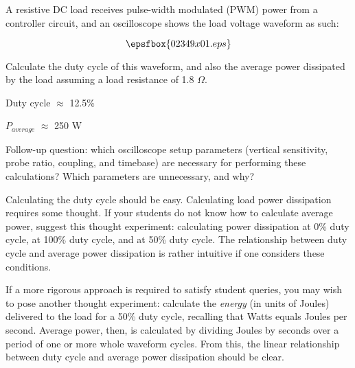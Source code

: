 

A resistive DC load receives pulse-width modulated (PWM) power from a controller circuit, and an oscilloscope shows the load voltage waveform as such:

$$\epsfbox{02349x01.eps}$$

Calculate the duty cycle of this waveform, and also the average power dissipated by the load assuming a load resistance of 1.8 $\Omega$.







Duty cycle $\approx$ 12.5\%

$P_{average}$ $\approx$ 250 W

\vskip 10pt

Follow-up question: which oscilloscope setup parameters (vertical sensitivity, probe ratio, coupling, and timebase) are necessary for performing these calculations?  Which parameters are unnecessary, and why?







Calculating the duty cycle should be easy.  Calculating load power dissipation requires some thought.  If your students do not know how to calculate average power, suggest this thought experiment: calculating power dissipation at 0\% duty cycle, at 100\% duty cycle, and at 50\% duty cycle.  The relationship between duty cycle and average power dissipation is rather intuitive if one considers these conditions.

If a more rigorous approach is required to satisfy student queries, you may wish to pose another thought experiment: calculate the {\it energy} (in units of Joules) delivered to the load for a 50\% duty cycle, recalling that Watts equals Joules per second.  Average power, then, is calculated by dividing Joules by seconds over a period of one or more whole waveform cycles.  From this, the linear relationship between duty cycle and average power dissipation should be clear.





